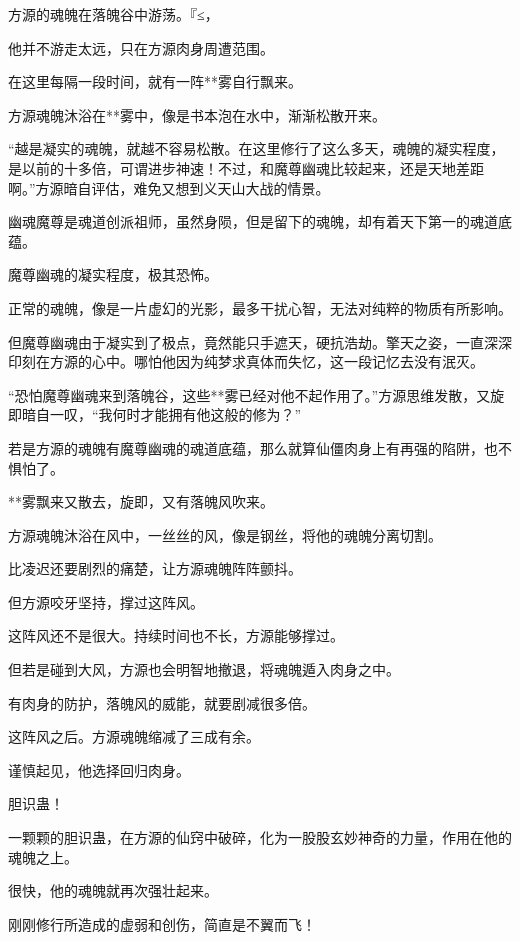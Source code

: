 
\begin{this_body}

方源的魂魄在落魄谷中游荡。『≤，

他并不游走太远，只在方源肉身周遭范围。

在这里每隔一段时间，就有一阵**雾自行飘来。

方源魂魄沐浴在**雾中，像是书本泡在水中，渐渐松散开来。

“越是凝实的魂魄，就越不容易松散。在这里修行了这么多天，魂魄的凝实程度，是以前的十多倍，可谓进步神速！不过，和魔尊幽魂比较起来，还是天地差距啊。”方源暗自评估，难免又想到义天山大战的情景。

幽魂魔尊是魂道创派祖师，虽然身陨，但是留下的魂魄，却有着天下第一的魂道底蕴。

魔尊幽魂的凝实程度，极其恐怖。

正常的魂魄，像是一片虚幻的光影，最多干扰心智，无法对纯粹的物质有所影响。

但魔尊幽魂由于凝实到了极点，竟然能只手遮天，硬抗浩劫。擎天之姿，一直深深印刻在方源的心中。哪怕他因为纯梦求真体而失忆，这一段记忆去没有泯灭。

“恐怕魔尊幽魂来到落魄谷，这些**雾已经对他不起作用了。”方源思维发散，又旋即暗自一叹，“我何时才能拥有他这般的修为？”

若是方源的魂魄有魔尊幽魂的魂道底蕴，那么就算仙僵肉身上有再强的陷阱，也不惧怕了。

**雾飘来又散去，旋即，又有落魄风吹来。

方源魂魄沐浴在风中，一丝丝的风，像是钢丝，将他的魂魄分离切割。

比凌迟还要剧烈的痛楚，让方源魂魄阵阵颤抖。

但方源咬牙坚持，撑过这阵风。

这阵风还不是很大。持续时间也不长，方源能够撑过。

但若是碰到大风，方源也会明智地撤退，将魂魄遁入肉身之中。

有肉身的防护，落魄风的威能，就要剧减很多倍。

这阵风之后。方源魂魄缩减了三成有余。

谨慎起见，他选择回归肉身。

胆识蛊！

一颗颗的胆识蛊，在方源的仙窍中破碎，化为一股股玄妙神奇的力量，作用在他的魂魄之上。

很快，他的魂魄就再次强壮起来。

刚刚修行所造成的虚弱和创伤，简直是不翼而飞！


\end{this_body}
